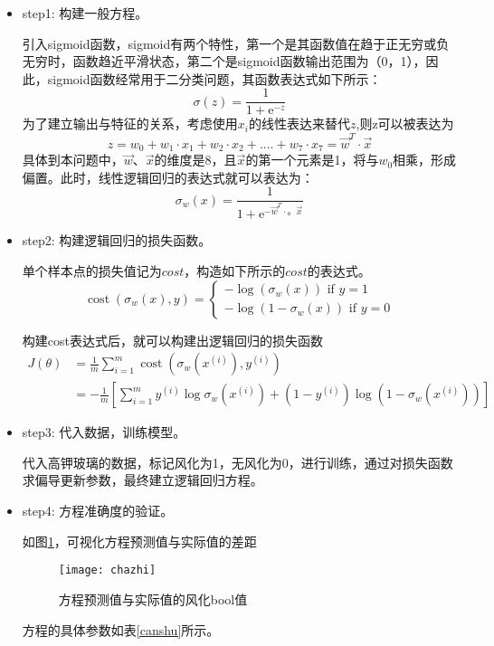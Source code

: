 \documentclass[withoutpreface,bwprint]{cumcmthesis} %
\begin{document}
\begin{itemize}
	\item step1: 构建一般方程。
	
	
	引入sigmoid函数，sigmoid有两个特性，第一个是其函数值在趋于正无穷或负无穷时，函数趋近平滑状态，第二个是sigmoid函数输出范围为（0，1），因此，sigmoid函数经常用于二分类问题，其函数表达式如下所示： $$\sigma(z)=\frac{1}{1+\mathrm{e}^{-z}}$$ 为了建立输出与特征的关系，考虑使用$x_{i}$的线性表达来替代$z$,则z可以被表达为 $$z=w_{0}+w_{1}\cdot x_{1} + w_{2}\cdot x_{2}+....+w_{7} \cdot x_{7} = \vec{w} ^{T} \cdot \vec{x}$$ 具体到本问题中，$\vec{w}$、$\vec{x}$的维度是8，且$\vec{x}$的第一个元素是1，将与$w_{0}$相乘，形成偏置。此时，线性逻辑回归的表达式就可以表达为： $$\sigma_{w}(x)=\frac{1}{1+\mathrm{e}^{-\vec{w} ^{T} \cdot。 \vec{x}}}$$
	\item step2: 构建逻辑回归的损失函数。
	
	
	单个样本点的损失值记为$cost$，构造如下所示的$cost$的表达式。 
	\[
	\operatorname{cost}\left(\sigma_{w}(x), y\right)=\left\{\begin{array}{r}
		-\log \left(\sigma_{w}(x)\right) \text { if } y=1 \\
		-\log \left(1-\sigma_{w}(x)\right) \text { if } y=0
	\end{array}\right.
	\] 
	
	构建cost表达式后，就可以构建出逻辑回归的损失函数
	\[\begin{aligned} J(\theta) &=\frac{1}{m} \sum_{i=1}^{m} \operatorname{cost}\left(\sigma_{w}\left(x^{(i)}\right), y^{(i)}\right) \ \\ &=-\frac{1}{m}\left[\sum_{i=1}^{m} y^{(i)} \log \sigma_{w}\left(x^{(i)}\right)+\left(1-y^{(i)}\right) \log \left(1-\sigma_{w}\left(x^{(i)}\right)\right)\right] \end{aligned}
	\]
	\item step3: 代入数据，训练模型。
	
	代入高钾玻璃的数据，标记风化为1，无风化为0，进行训练，通过对损失函数求偏导更新参数，最终建立逻辑回归方程。
	
	\item step4: 方程准确度的验证。
	
	如图\ref{chazhi}，可视化方程预测值与实际值的差距
	
	\begin{figure}[!h]
		\centering
		\texttt{[image: chazhi]}
		\caption{方程预测值与实际值的风化bool值}
		\label{chazhi}
	\end{figure}
	
	方程的具体参数如表\ref{canshu}所示。
	

\end{itemize}
\end{document}
